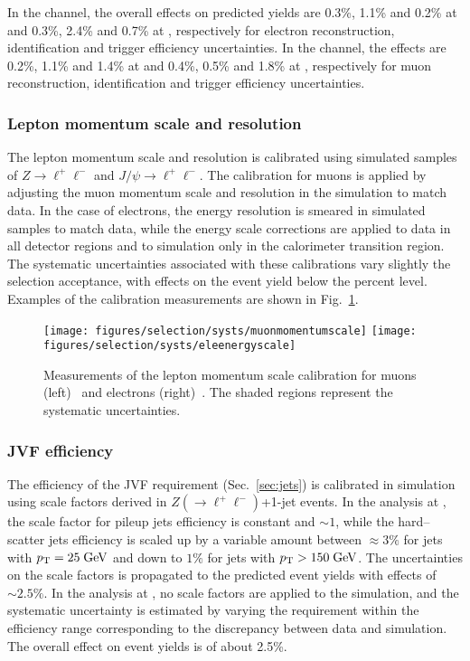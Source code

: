 In the \ejets{} channel, the overall effects on predicted yields are 0.3\%, 1.1\% 
and 0.2\% at \seventev{} and 0.3\%, 2.4\% and 0.7\% at \eighttev{},
respectively for electron reconstruction, identification and trigger
efficiency uncertainties.
In the \mujets{} channel, the effects are 0.2\%, 1.1\% and 1.4\% at
\seventev{} and 0.4\%, 0.5\% and 1.8\% at \eighttev{},
respectively for muon reconstruction, identification and trigger
efficiency uncertainties.

\subsubsection{Lepton momentum scale and resolution}
\label{sec:lepscale}

The lepton momentum scale and resolution is calibrated using
simulated samples of $Z\to \ell^+\ell^-$ and $J/\psi \to
\ell^+\ell^-$.
The calibration for muons is applied by adjusting the muon momentum
scale and resolution in the simulation to match data. In the case of
electrons, the energy resolution is smeared in simulated samples to
match data, while the energy scale corrections are applied to data in
all detector regions and to simulation only in the calorimeter
transition region. 
The systematic uncertainties associated with these calibrations vary
slightly the selection acceptance, with effects on the event yield
below the percent level. Examples of the calibration measurements are
shown in Fig.~\ref{fig:lepscalesyst}.

\begin{figure}\centering
  \texttt{[image: figures/selection/systs/muonmomentumscale]}
  \texttt{[image: figures/selection/systs/eleenergyscale]}
  \caption{
    Measurements of the lepton momentum scale calibration for muons
    (left)~\cite{Sforza:1529999} and electrons
    (right)~\cite{Aad:2014nim}. The shaded regions represent the
    systematic uncertainties. 
  }
  \label{fig:lepscalesyst}
\end{figure}

\subsubsection{JVF efficiency}
\label{sec:syst_jvf}

The efficiency of the JVF requirement (Sec.~\ref{sec:jets}) is
calibrated in simulation using scale factors derived in $Z(\to
\ell^+\ell^-)$+1-jet events. In the analysis at \seventev{}, the scale
factor for pileup jets efficiency is constant and $\sim1$, while the
hard--scatter jets efficiency is scaled up by a variable amount
between $\approx3\%$ for jets with $p_{\mathrm{T}}{}=25\; \mathrm{GeV}{}$ and down to $1\%$
for jets with $p_{\mathrm{T}}{}>150\; \mathrm{GeV}{}$. The uncertainties on the scale
factors is propagated to the predicted event yields with effects of
$\sim2.5\%$. In the analysis at \eighttev{}, no scale factors are
applied to the simulation, and the systematic
uncertainty is estimated by varying the requirement within the
efficiency range corresponding to the discrepancy between data and
simulation. The overall effect on event yields is of about 2.5\%.

